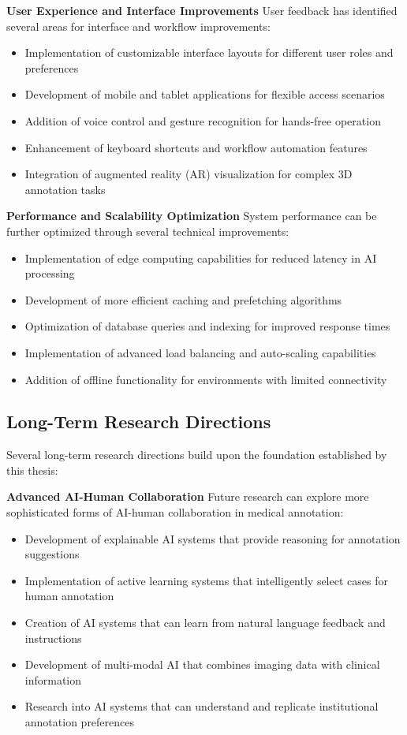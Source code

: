 \textbf{User Experience and Interface Improvements}
User feedback has identified several areas for interface and workflow improvements:

\begin{itemize}
    \item Implementation of customizable interface layouts for different user roles and preferences
    \item Development of mobile and tablet applications for flexible access scenarios
    \item Addition of voice control and gesture recognition for hands-free operation
    \item Enhancement of keyboard shortcuts and workflow automation features
    \item Integration of augmented reality (AR) visualization for complex 3D annotation tasks
\end{itemize}

\textbf{Performance and Scalability Optimization}
System performance can be further optimized through several technical improvements:

\begin{itemize}
    \item Implementation of edge computing capabilities for reduced latency in AI processing
    \item Development of more efficient caching and prefetching algorithms
    \item Optimization of database queries and indexing for improved response times
    \item Implementation of advanced load balancing and auto-scaling capabilities
    \item Addition of offline functionality for environments with limited connectivity
\end{itemize}

\subsection{Long-Term Research Directions}

Several long-term research directions build upon the foundation established by this thesis:

\textbf{Advanced AI-Human Collaboration}
Future research can explore more sophisticated forms of AI-human collaboration in medical annotation:

\begin{itemize}
    \item Development of explainable AI systems that provide reasoning for annotation suggestions
    \item Implementation of active learning systems that intelligently select cases for human annotation
    \item Creation of AI systems that can learn from natural language feedback and instructions
    \item Development of multi-modal AI that combines imaging data with clinical information
    \item Research into AI systems that can understand and replicate institutional annotation preferences
\end{itemize}

